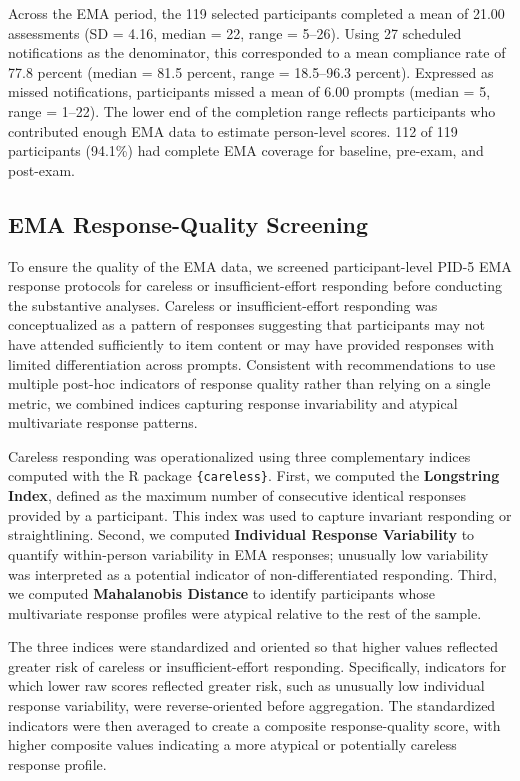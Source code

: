 \documentclass[
  english,
  man,floatsintext]{apa6}
\begin{document}
Across the EMA period, the 119 selected participants completed a mean of 21.00 assessments (SD = 4.16, median = 22, range = 5--26). Using 27 scheduled notifications as the denominator, this corresponded to a mean compliance rate of 77.8 percent (median = 81.5 percent, range = 18.5--96.3 percent). Expressed as missed notifications, participants missed a mean of 6.00 prompts (median = 5, range = 1--22). The lower end of the completion range reflects participants who contributed enough EMA data to estimate person-level scores. 112 of 119 participants (94.1\%) had complete EMA coverage for baseline, pre-exam, and post-exam.

\subsection{EMA Response-Quality Screening}\label{s-ema-quality}

To ensure the quality of the EMA data, we screened participant-level PID-5 EMA response protocols for careless or insufficient-effort responding before conducting the substantive analyses. Careless or insufficient-effort responding was conceptualized as a pattern of responses suggesting that participants may not have attended sufficiently to item content or may have provided responses with limited differentiation across prompts. Consistent with recommendations to use multiple post-hoc indicators of response quality rather than relying on a single metric, we combined indices capturing response invariability and atypical multivariate response patterns.

Careless responding was operationalized using three complementary indices computed with the R package \texttt{\{careless\}}. First, we computed the \textbf{Longstring Index}, defined as the maximum number of consecutive identical responses provided by a participant. This index was used to capture invariant responding or straightlining. Second, we computed \textbf{Individual Response Variability} to quantify within-person variability in EMA responses; unusually low variability was interpreted as a potential indicator of non-differentiated responding. Third, we computed \textbf{Mahalanobis Distance} to identify participants whose multivariate response profiles were atypical relative to the rest of the sample.

The three indices were standardized and oriented so that higher values reflected greater risk of careless or insufficient-effort responding. Specifically, indicators for which lower raw scores reflected greater risk, such as unusually low individual response variability, were reverse-oriented before aggregation. The standardized indicators were then averaged to create a composite response-quality score, with higher composite values indicating a more atypical or potentially careless response profile.
\end{document}
